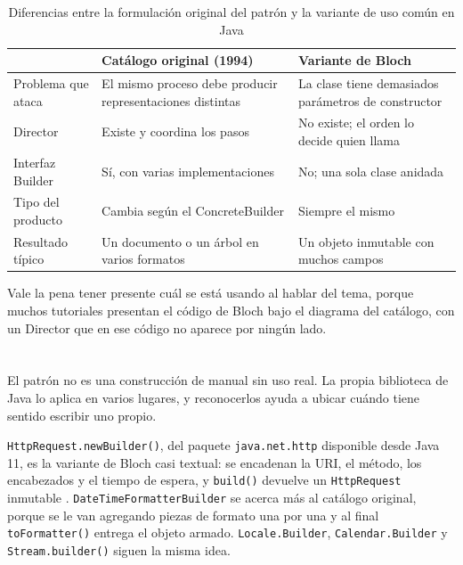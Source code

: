 \documentclass[10pt,a4paper]{article}
\begin{document}
\begin{table}[H]
	\centering
	\begin{tabular}{p{3.4cm} | p{4.6cm} | p{4.6cm}}\hline \hline
		 & \textbf{Catálogo original (1994)} & \textbf{Variante de Bloch} \\ \hline \hline
		Problema que ataca & El mismo proceso debe producir representaciones distintas & La clase tiene demasiados parámetros de constructor \\ \hline
		Director & Existe y coordina los pasos & No existe; el orden lo decide quien llama \\ \hline
		Interfaz Builder & Sí, con varias implementaciones & No; una sola clase anidada \\ \hline
		Tipo del producto & Cambia según el ConcreteBuilder & Siempre el mismo \\ \hline
		Resultado típico & Un documento o un árbol en varios formatos & Un objeto inmutable con muchos campos \\ \hline \hline
	\end{tabular}
	\caption{Diferencias entre la formulación original del patrón y la variante de uso común en Java}
	\label{tabla:comparacion}
\end{table}

Vale la pena tener presente cuál se está usando al hablar del tema, porque muchos tutoriales presentan el código de Bloch bajo el diagrama del catálogo, con un Director que en ese código no aparece por ningún lado.

\section{\color{colorIPN}{Dónde aparece en la biblioteca estándar}}

El patrón no es una construcción de manual sin uso real. La propia biblioteca de Java lo aplica en varios lugares, y reconocerlos ayuda a ubicar cuándo tiene sentido escribir uno propio.

\texttt{HttpRequest.newBuilder()}, del paquete \texttt{java.net.http} disponible desde Java 11, es la variante de Bloch casi textual: se encadenan la URI, el método, los encabezados y el tiempo de espera, y \texttt{build()} devuelve un \texttt{HttpRequest} inmutable \cite{oracle_httprequest}. \texttt{DateTimeFormatterBuilder} se acerca más al catálogo original, porque se le van agregando piezas de formato una por una y al final \texttt{toFormatter()} entrega el objeto armado. \texttt{Locale.Builder}, \texttt{Calendar.Builder} y \texttt{Stream.builder()} siguen la misma idea.
\end{document}
